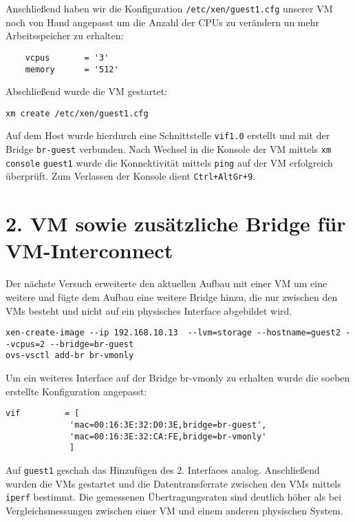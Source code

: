 Anschließend haben wir die Konfiguration \verb#/etc/xen/guest1.cfg# unserer VM noch von Hand angepasst um die Anzahl der CPUs zu verändern un mehr Arbeitsspeicher zu erhalten:
\setupVerbatimOut
\begin{verbatim}
    vcpus       = '3'
    memory      = '512'
\end{verbatim}

Abschließend wurde die VM gestartet:
\begin{verbatim}
xm create /etc/xen/guest1.cfg
\end{verbatim}

Auf dem Host wurde hierdurch eine Schnittstelle \verb#vif1.0# erstellt und mit der Bridge \verb#br-guest# verbunden. Nach Wechsel in die Konsole der VM mittels \verb#xm# \verb#console# \verb#guest1# wurde die Konnektivität mittels \verb#ping# auf der VM erfolgreich überprüft. Zum Verlassen der Konsole dient \verb#Ctrl+AltGr+9#.

\section{2. VM sowie zusätzliche Bridge für VM-Interconnect}
Der nächste Versuch erweiterte den aktuellen Aufbau mit einer VM um eine weitere und fügte dem Aufbau eine weitere Bridge hinzu, die nur zwischen den VMs besteht und nicht auf ein physisches Interface abgebildet wird.
\begin{verbatim}
xen-create-image --ip 192.168.10.13  --lvm=storage --hostname=guest2 --vcpus=2 --bridge=br-guest
ovs-vsctl add-br br-vmonly
\end{verbatim}
Um ein weiteres Interface auf der Bridge br-vmonly zu erhalten wurde die soeben erstellte Konfiguration angepasst:
\setupVerbatimOut
\begin{verbatim}
vif         = [
    		 'mac=00:16:3E:32:D0:3E,bridge=br-guest',
			 'mac=00:16:3E:32:CA:FE,bridge=br-vmonly' 
             ]
\end{verbatim}
Auf \verb#guest1# geschah das Hinzufügen des 2. Interfaces analog. Anschließend wurden die VMs gestartet und die Datentransferrate zwischen den VMs mittels \verb#iperf# bestimmt. Die gemessenen Übertragungsraten sind deutlich höher als bei Vergleichsmessungen zwischen einer VM und einem anderen physischen System.

